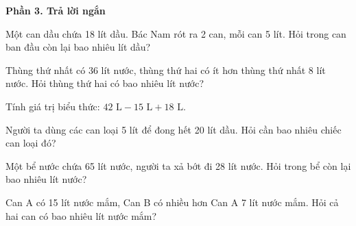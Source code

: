 \textbf{Phần 3. Trả lời ngắn}

\begin{ex} %
Một can dầu chứa 18 lít dầu. Bác Nam rót ra 2 can, mỗi can 5 lít. Hỏi trong can ban đầu còn lại bao nhiêu lít dầu?
\end{ex}

\begin{ex} %
Thùng thứ nhất có 36 lít nước, thùng thứ hai có ít hơn thùng thứ nhất 8 lít nước. Hỏi thùng thứ hai có bao nhiêu lít nước?
\end{ex}

\begin{ex} %
Tính giá trị biểu thức: $42\text{ L} - 15\text{ L} + 18\text{ L}$.
\end{ex}

\begin{ex} %
Người ta dùng các can loại 5 lít để đong hết 20 lít dầu. Hỏi cần bao nhiêu chiếc can loại đó?
\end{ex}

\begin{ex} %
Một bể nước chứa 65 lít nước, người ta xả bớt đi 28 lít nước. Hỏi trong bể còn lại bao nhiêu lít nước?
\end{ex}

\begin{ex} %
Can A có 15 lít nước mắm, Can B có nhiều hơn Can A 7 lít nước mắm. Hỏi cả hai can có bao nhiêu lít nước mắm?
\end{ex}
